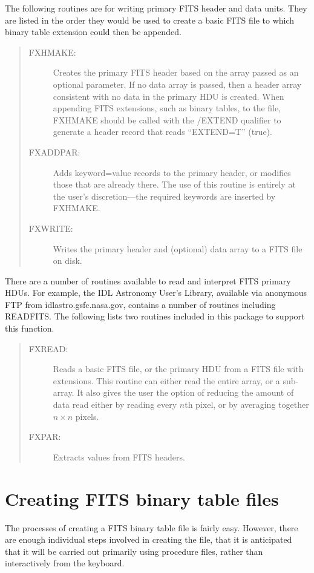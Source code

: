 The following routines are for writing primary FITS header and data units.
They are listed in the order they would be used to create a basic FITS file to
which binary table extension could then be appended.
\begin{quote}
\begin{description}
\item[FXHMAKE:]
Creates the primary FITS header based on the array passed as an optional
parameter.  If no data array is passed, then a header array consistent with no
data in the primary HDU is created.  When appending FITS extensions, such as
binary tables, to the file, FXHMAKE should be called with the /EXTEND qualifier
to generate a header record that reads ``EXTEND=T'' (true).
\item[FXADDPAR:]
Adds keyword=value records to the primary header, or modifies those that are
already there.  The use of this routine is entirely at the user's
discretion---the required keywords are inserted by FXHMAKE.
\item[FXWRITE:]
Writes the primary header and (optional) data array to a FITS file on disk.
\end{description}
\end{quote}

There are a number of routines available to read and interpret FITS primary
HDUs.  For example, the IDL Astronomy User's Library, available via anonymous
FTP from idlastro.gsfc.nasa.gov, contains a number of routines including
READFITS\@.  The following lists two routines included in this package to
support this function.
\begin{quote}
\begin{description}
\item[FXREAD:]
Reads a basic FITS file, or the primary HDU from a FITS file with extensions.
This routine can either read the entire array, or a sub-array.  It also gives
the user the option of reducing the amount of data read either by reading every
$n$th pixel, or by averaging together \mbox{$n \times n$} pixels.
\item[FXPAR:]
Extracts values from FITS headers.
\end{description}
\end{quote}

\section{Creating FITS binary table files}
\label{creating}

The processes of creating a FITS binary table file is fairly easy.  However,
there are enough individual steps involved in creating the file, that it is
anticipated that it will be carried out primarily using procedure files, rather
than interactively from the keyboard.

